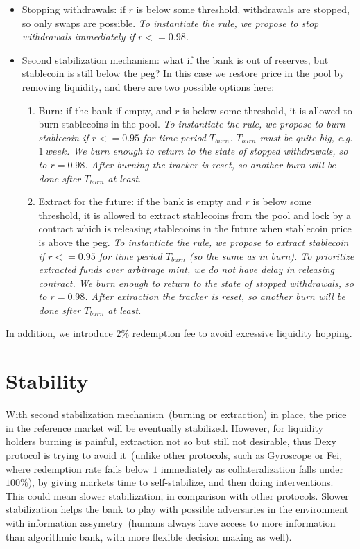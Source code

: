 \documentclass{article}   %
\newcommand{\sct}{stablecoin}
\newcommand{\dx}{Dexy}
\begin{document}
\begin{itemize}
   \item{Stopping withdrawals: } if $r$ is below some threshold, withdrawals are stopped, so only swaps are possible.  
   \em{To instantiate the rule, we propose to stop withdrawals immediately if $r <= 0.98$.}

   \item{Second stabilization mechanism: } what if the bank is out of reserves, but \sct{} is still below the peg? In this case we restore price in the pool by removing liquidity, and there are two possible options here:

   \begin{enumerate}
   \item{Burn: } if the bank if empty, and $r$ is below some threshold, it is allowed to burn \sct{}s in the pool. 
   \em{To instantiate the rule, we propose to burn \sct{} if $r <= 0.95$ for time period $T_{burn}$. $T_{burn}$ must be quite big, e.g. $1 {\ week}$. We burn enough to return to the state of stopped withdrawals, so to $r = 0.98$. After burning the tracker is reset, so another burn will be done sfter $T_{burn}$ at least.}

   \item{Extract for the future: } if the bank is empty and $r$ is below some threshold, it is allowed to extract \sct{}s from the pool and lock by a contract which is releasing \sct{}s in the future when \sct{} price is above the peg.
   \em{To instantiate the rule, we propose to extract \sct{} if $r <= 0.95$ for time period $T_{burn}$ (so the same as in burn). 
   To prioritize extracted funds over arbitrage mint, we do not have delay in releasing contract. We burn enough to return to the state of stopped withdrawals, so to $r = 0.98$. After extraction the tracker is reset, so another burn will be done sfter $T_{burn}$ at least.}
   \end{enumerate}
\end{itemize} 

In addition, we introduce $2\%$ redemption fee to avoid excessive liquidity hopping.

\section{Stability}
\label{stability}

With second stabilization mechanism~(burning or extraction) in place, the price in the reference market will be eventually stabilized. However, for liquidity holders burning is painful, extraction not so but still not desirable, thus \dx{} protocol is trying to avoid it~(unlike other protocols, such as Gyroscope or Fei, where redemption rate fails below $1$ immediately as collateralization falls under $100\%$), by giving markets time to self-stabilize, and then doing interventions. This could mean slower stabilization, in comparison with other protocols. Slower stabilization helps the bank to play with possible adversaries in the environment with information assymetry~(humans always have access to more information than algorithmic bank, with more flexible decision making as well).
\end{document}
